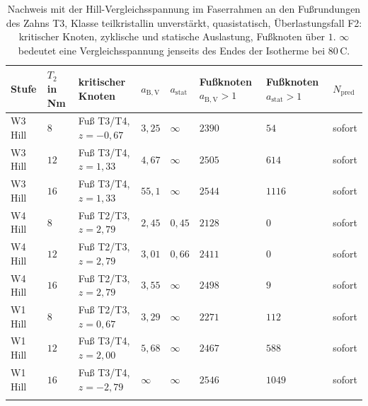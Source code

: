 \begin{table}[htbp]
    \caption{Nachweis mit der Hill-Vergleichs\-spannung im Faserrahmen an den Fußrundungen des Zahns T3, Klasse teilkristallin unverstärkt, quasistatisch, Überlastungsfall F2: kritischer Knoten, zyklische und statische Auslastung, Fußknoten über $1$. $\infty$ bedeutet eine Vergleichsspannung jenseits des Endes der Isotherme bei $80$\,\textdegree C.}
    \label{tab:stommel_hill}
    \centering
    \footnotesize
    \setlength{\tabcolsep}{4pt}
    \begin{tabular}{L{1.6cm}L{1.2cm}L{3.2cm}L{1.3cm}L{1.3cm}L{1.8cm}L{1.8cm}L{1.6cm}}
        Stufe   & $T_{2}$ in Nm & kritischer Knoten        & $a_{\mathrm{B,V}}$ & $a_{\mathrm{stat}}$ & Fußknoten $a_{\mathrm{B,V}} > 1$ & Fußknoten $a_{\mathrm{stat}} > 1$ & $N_{\mathrm{pred}}$ \\
        \hline
        W3 Hill & $8$           & Fuß T3/T4, $z = -0{,}67$ & $3{,}25$           & $\infty$            & $2390$                           & $54$                              & sofort              \\
        \hline
        W3 Hill & $12$          & Fuß T3/T4, $z = 1{,}33$  & $4{,}67$           & $\infty$            & $2505$                           & $614$                             & sofort              \\
        \hline
        W3 Hill & $16$          & Fuß T3/T4, $z = 1{,}33$  & $55{,}1$           & $\infty$            & $2544$                           & $1116$                            & sofort              \\
        \hline
        W4 Hill & $8$           & Fuß T2/T3, $z = 2{,}79$  & $2{,}45$           & $0{,}45$            & $2128$                           & $0$                               & sofort              \\
        \hline
        W4 Hill & $12$          & Fuß T2/T3, $z = 2{,}79$  & $3{,}01$           & $0{,}66$            & $2411$                           & $0$                               & sofort              \\
        \hline
        W4 Hill & $16$          & Fuß T2/T3, $z = 2{,}79$  & $3{,}55$           & $\infty$            & $2498$                           & $9$                               & sofort              \\
        \hline
        W1 Hill & $8$           & Fuß T2/T3, $z = 0{,}67$  & $3{,}29$           & $\infty$            & $2271$                           & $112$                             & sofort              \\
        \hline
        W1 Hill & $12$          & Fuß T3/T4, $z = 2{,}00$  & $5{,}68$           & $\infty$            & $2467$                           & $588$                             & sofort              \\
        \hline
        W1 Hill & $16$          & Fuß T3/T4, $z = -2{,}79$ & $\infty$           & $\infty$            & $2546$                           & $1049$                            & sofort              \\
        \hline
    \end{tabular}
\end{table}

